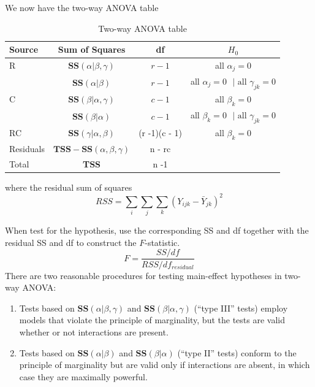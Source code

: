 We now have the two-way ANOVA table
\begin{table}[H]
	\renewcommand{\arraystretch}{1.5}
	\caption{Two-way ANOVA table}
	\label{tab:one_way_anova_table}
	\centering
	\begin{tabular}{lccc}
		\toprule
		Source & Sum of Squares & df &  $H_0$\\
		\hline
		R & $\textbf{SS}(\alpha |  \beta, \gamma)$ & $r - 1$ & all $\alpha_j = 0$\\
		& $\textbf{SS}(\alpha |  \beta)$ & $r - 1$ & all $\alpha_j = 0 \mbox{ } | \mbox{ all } \gamma_{jk} = 0$\\
		\hline
		C & $\textbf{SS}(\beta |  \alpha, \gamma)$ & $c - 1$ & all $\beta_k = 0$\\
		   & $\textbf{SS}(\beta |  \alpha)$ & $c - 1$ & all $\beta_k = 0 \mbox{ } | \mbox{ all } \gamma_{jk} = 0$\\	
		\hline
		RC & $\textbf{SS}(\gamma | \alpha, \beta)$ & (r -1)(c - 1) &  all $\beta_k = 0$\\
		\hline
		Residuals & $\textbf{TSS} - \textbf{SS}(\alpha, \beta, \gamma)$ & n - rc &\\
		\hline
		Total &\textbf{TSS}& n -1 &\\
		\bottomrule
	\end{tabular}
\end{table}
where the residual sum of squares
$$
RSS = \sum\limits_i\sum\limits_j\sum\limits_k(Y_{ijk} - \bar{Y}_{jk})^2
$$

When test for the hypothesis, use the corresponding SS and df together with the residual SS and df to construct the $F$-statistic.
$$
F = \frac{SS/df}{RSS / df_{residual}}
$$
There are two reasonable procedures for testing main-effect hypotheses in two-way ANOVA:
\begin{enumerate}
	\item Tests based on $\textbf{SS}(\alpha | \beta, \gamma)$ and  $\textbf{SS}(\beta | \alpha, \gamma)$  (``type III'' tests) employ models that violate the principle of marginality, but the tests are valid whether or not interactions are present.
	\item Tests based on $\textbf{SS}(\alpha | \beta)$ and $\textbf{SS}(\beta | \alpha)$ (``type II'' tests) conform to the principle of marginality but are valid only if interactions are absent, in which case they are maximally powerful.
\end{enumerate}

